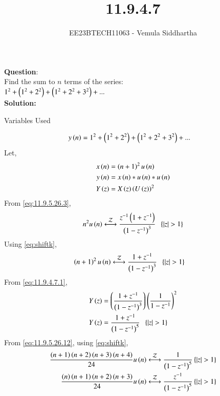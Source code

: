 \documentclass[journal,12pt,twocolumn]{IEEEtran}
\theoremstyle{remark}
\begin{document}

\vspace{3cm}

\title{11.9.4.7}
\author{EE23BTECH11063 - Vemula Siddhartha
}
\maketitle
\newpage
\bigskip

\renewcommand{\thefigure}{\theenumi}
\renewcommand{\thetable}{\theenumi}
\textbf{Question}:\\
Find the sum to $n$ terms of the series:\\
    $1^2+\left(1^2+2^2\right)+\left(1^2+2^2+3^2\right)+...$
    \\
\textbf{Solution:}
\begin{table}[h!]    
    \centering
    
    \caption{Variables Used}
    \label{tab10.5.3.9.1}
  \end{table}
\begin{align}
    y\left(n\right)&=1^2+\left(1^2+2^2\right)+\left(1^2+2^2+3^2\right)+...
\end{align}
Let,
\begin{align}
    x\left(n\right)&=\left(n+1\right)^2u\left(n\right)\\
    y\left(n\right)&=x\left(n\right)*u\left(n\right)*u\left(n\right)\\
    Y\left(z\right)&=X\left(z\right)\left(U\left(z\right)\right)^2
\end{align}
From \eqref{eq:11.9.5.26.3},
\begin{align}
    n^2u\brak{n}\system{Z}\frac{z^{-1}\brak{1+z^{-1}}}{\brak{1-z^{-1}}^3}\;\;\cbrak{\abs{z}>1}
\end{align}
Using \eqref{eq:shiftk},
\begin{align}
    \brak{n+1}^2u\brak{n}&\system{Z}\frac{1+z^{-1}}{\brak{1-z^{-1}}^3}\;\;\cbrak{\abs{z}>1}\label{eq:11.9.4.7.1}
\end{align}
From \eqref{eq:11.9.4.7.1},
\begin{align}
    Y\left(z\right)&=\left(\frac{1+z^{-1}}{\left(1-z^{-1}\right)^3}\right)\left(\frac{1}{1-z^{-1}}\right)^2\\
    Y\left(z\right)&=\frac{1+z^{-1}}{\left(1-z^{-1}\right)^5}\;\;\left\{\left\vert z\right\vert>1\right\}
\end{align}
From \eqref{eq:11.9.5.26.12}, using \eqref{eq:shiftk},
\begin{align}
    \frac{\brak{n+1}\brak{n+2}\brak{n+3}\brak{n+4}}{24}u\brak{n}&\system{Z}\frac{1}{\brak{1-z^{-1}}^5}\label{eq:11.9.4.7.2}\cbrak{\abs{z}>1}\\
    \frac{\brak{n}\brak{n+1}\brak{n+2}\brak{n+3}}{24}u\brak{n}&\system{Z}\frac{z^{-1}}{\brak{1-z^{-1}}^5}\label{eq:11.9.4.7.3}\cbrak{\abs{z}>1}
\end{align}
\end{document}
